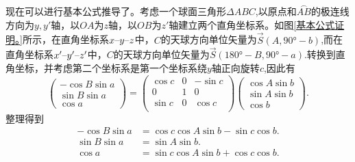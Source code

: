 \documentclass[11pt, a4paper, oneside]{ctexart}
\numberwithin{equation}{subsection}
\begin{document}
现在可以进行基本公式推导了。考虑一个球面三角形$\Delta ABC$,以原点和$\overset{\frown}{AB}$的极连线方向为$y,y'$轴，以$OA$为$z$轴，以$OB$为$z'$轴建立两个直角坐标系。如图\ref{基本公式证明。}所示，在直角坐标系$x\text{\textendash}y\text{\textendash}z$中，$C$的天球方向单位矢量为$\vec{S}\left(A,\ang{90;;}-b\right)$,而在直角坐标系$x'\text{\textendash}y'\text{\textendash}z'$中，$C$的天球方向单位矢量为$\vec{S}\left(\ang{180;;}-B,\ang{90;;}-a\right)$.转换到直角坐标，并考虑第二个坐标系是第一个坐标系绕$y$轴正向旋转$c$,因此有
\begin{equation}
\begin{pmatrix}
-\cos B\sin a\\
\sin B\sin a\\
\cos a
\end{pmatrix}=
\begin{pmatrix}
\cos c & 0 & -\sin c\\
0 & 1 & 0\\
\sin c & 0 & \cos c\\
\end{pmatrix}
\begin{pmatrix}
\cos A\sin b\\
\sin A\sin b\\
\cos b
\end{pmatrix}.
\end{equation}
整理得到
\begin{align}
-\cos B\sin a&=\cos c\cos A\sin b-\sin c\cos b.\label{1.1.9}\\
\sin B\sin a&=\sin A\sin b.\label{1.1.10}\\
\cos a&=\sin c\cos A\sin b+\cos c\cos b.\label{1.1.11}
\end{align}
\end{document}
